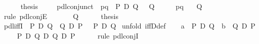 \begin{isabellebody}
\ \ \ \ \isamarkupfalse%
\ {\isacharquery}thesis\ \isamarkupfalse%
\isacommand{{\isachardot}}\isanewline
\ \ \isamarkupfalse%
\isanewline
\isamarkupfalse%
\isanewline
\isanewline
\isamarkupfalse%
\ pdl{\isacharunderscore}conjunct{}{\isacharcolon}\ \ pq{\isacharcolon}\ {\isachardoublequote}{\isasymturnstile}\ P\ {\isasymand}\isactrlsub D\ Q{\isachardoublequote}\ \ {\isachardoublequote}{\isasymturnstile}\ Q{\isachardoublequote}\isanewline
\isamarkupfalse%
\ {\isacharminus}\isanewline
\ \ \isamarkupfalse%
\ pq\ \isamarkupfalse%
\ {\isachardoublequote}{\isasymturnstile}\ Q{\isachardoublequote}\isanewline
\ \ \isamarkupfalse%
\ {\isacharparenleft}rule\ pdl{\isacharunderscore}conjE{\isacharparenright}\isanewline
\ \ \ \ \isamarkupfalse%
\ {\isachardoublequote}{\isasymturnstile}\ Q{\isachardoublequote}\isanewline
\ \ \ \ \isamarkupfalse%
\ {\isacharquery}thesis\ \isamarkupfalse%
\isacommand{{\isachardot}}\isanewline
\ \ \isamarkupfalse%
\isanewline
\isamarkupfalse%
\isanewline
\ \ \ \ \isanewline
\isamarkupfalse%
\ pdl{\isacharunderscore}iffI{\isacharcolon}\ {\isachardoublequote}{\isasymlbrakk}{\isasymturnstile}\ P\ {\isasymlongrightarrow}\isactrlsub D\ Q{\isacharsemicolon}\ {\isasymturnstile}\ Q\ {\isasymlongrightarrow}\isactrlsub D\ P{\isasymrbrakk}\ {\isasymLongrightarrow}\ {\isasymturnstile}\ P\ {\isasymlongleftrightarrow}\isactrlsub D\ Q{\isachardoublequote}\isanewline
\isamarkupfalse%
\ {\isacharparenleft}unfold\ iffD{\isacharunderscore}def{\isacharparenright}\isanewline
\ \ \isamarkupfalse%
\ a{\isacharcolon}\ {\isachardoublequote}{\isasymturnstile}\ P\ {\isasymlongrightarrow}\isactrlsub D\ Q{\isachardoublequote}\ \ b{\isacharcolon}\ {\isachardoublequote}{\isasymturnstile}\ Q\ {\isasymlongrightarrow}\isactrlsub D\ P{\isachardoublequote}\isanewline
\ \ \isamarkupfalse%
\ {\isachardoublequote}{\isasymturnstile}\ {\isacharparenleft}P\ {\isasymlongrightarrow}\isactrlsub D\ Q{\isacharparenright}\ {\isasymand}\isactrlsub D\ {\isacharparenleft}Q\ {\isasymlongrightarrow}\isactrlsub D\ P{\isacharparenright}{\isachardoublequote}\isanewline
\ \ \ \ \isamarkupfalse%
\ {\isacharparenleft}rule\ pdl{\isacharunderscore}conjI{\isacharparenright}\isanewline
\isamarkupfalse%
\isanewline
\isanewline
\isamarkupfalse%

\end{isabellebody}
